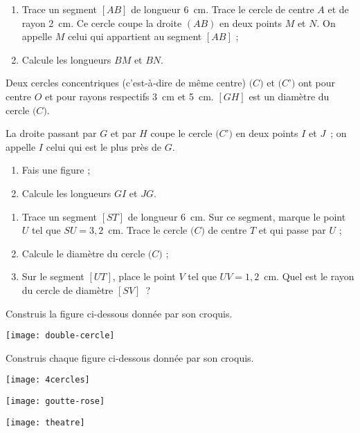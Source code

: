\begin{exercice}[Calculs]
 \begin{enumerate}
  \item Trace un segment $[AB]$ de longueur 6 cm. Trace le cercle de centre $A$ et de rayon 2 cm. Ce cercle coupe la droite $(AB)$ en deux points $M$ et $N$. On appelle $M$ celui qui appartient au segment $[AB]$ ;
  \item Calcule les longueurs $BM$ et $BN$.
 \end{enumerate}
\end{exercice}


\begin{exercice}[Concentriques]
Deux cercles concentriques (c'est‑à‑dire de même centre) $\mathcal(C)$ et $\mathcal(C’)$ ont pour centre $O$ et pour rayons respectifs 3 cm et 5 cm. $[GH]$ est un diamètre du cercle $\mathcal(C)$. 

La droite passant par $G$ et par $H$ coupe le cercle $\mathcal(C’)$ en deux points $I$ et $J$ ; on appelle $I$ celui qui est le plus près de $G$.
\begin{enumerate}
  \item Fais une figure ;
  \item Calcule les longueurs $GI$ et $JG$.
 \end{enumerate}
\end{exercice}


\begin{exercice}[Calculs]
\begin{enumerate}
  \item Trace un segment $[ST]$ de longueur 6 cm. Sur ce segment, marque le point $U$ tel que $SU = 3,2$ cm. Trace le cercle $\mathcal(C)$ de centre $T$ et qui passe par $U$ ;
  \item Calcule le diamètre du cercle $\mathcal(C)$ ;
  \item Sur le segment $[UT]$, place le point $V$ tel que $UV = 1,2$ cm. Quel est le rayon du cercle de diamètre $[SV]$ ?
 \end{enumerate}
\end{exercice}


\begin{exercice}
Construis la figure ci-dessous donnée par son croquis.

\begin{center} \texttt{[image: double-cercle]} \end{center}
\end{exercice}


\begin{exercice}
Construis chaque figure ci-dessous donnée par son croquis.
\begin{colenumerate}{2}
 \item
 
 \texttt{[image: 4cercles]}
 \item
 
\texttt{[image: goutte-rose]}
 \item
 
\texttt{[image: theatre]}
 \end{colenumerate}
\end{exercice}


